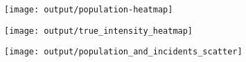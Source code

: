     \centering
    \begin{subfigure}[t]{0.33\textwidth}
    \texttt{[image: output/population-heatmap]}
    \end{subfigure}
    \begin{subfigure}[t]{0.33\textwidth}
    \texttt{[image: output/true\_intensity\_heatmap]}
    \end{subfigure}%
    \begin{subfigure}[t]{0.32\textwidth}
    \texttt{[image: output/population\_and\_incidents\_scatter]}
    \end{subfigure}%
